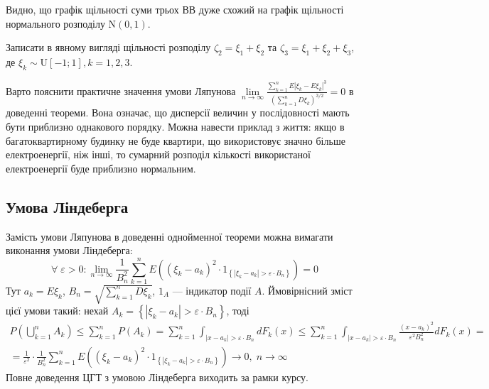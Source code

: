 Видно, що графік щільності суми трьох ВВ дуже схожий на графік щільності нормального розподілу $\mathrm{N}\left(0, 1\right)$.
\begin{exercise}
    Записати в явному вигляді щільності розподілу $\zeta_2 = \xi_1 + \xi_2$ та $\zeta_3 = \xi_1 + \xi_2 + \xi_3$, де
    $\xi_k \sim \mathrm{U}[-1; 1], k = 1,2,3$.
\end{exercise}
Варто пояснити практичне значення умови Ляпунова $\underset{n \rightarrow \infty}{\lim} \frac{\sum\limits_{k=1}^n E\left| \xi_k - E\xi_k\right|^3}{\left(
    \sum\limits_{k=1}^n D\xi_k
\right)^{3/2}} = 0$ в доведенні теореми. Вона означає, що дисперсії величин у послідовності мають бути приблизно однакового порядку. 
Можна навести приклад з життя: якщо в багатоквартирному будинку не буде квартири, що використовує значно більше електроенергії, ніж інші,
то сумарний розподіл кількості використаної електроенергії буде приблизно нормальним.

\subsection{Умова Ліндеберга}
    Замість умови Ляпунова в доведенні однойменної теореми можна вимагати виконання умови Ліндеберга:
    $$\forall \; \varepsilon > 0 : \underset{n\to\infty}{\lim} 
    \frac{1}{B_n^2}\sum\limits_{k=1}^n E \left( \left( \xi_k - a_k\right)^2 \cdot 1_{\left\{|\xi_k - a_k| > \varepsilon \cdot B_n\right\}}\right) = 0$$
    Тут $a_k = E\xi_k$, $B_n = \sqrt{\sum\limits_{k=1}^n D\xi_k}$, $1_A$ --- індикатор події $A$.
    Ймовірнісний зміст цієї умови такий: нехай $A_k = \left\{ \left|\xi_k - a_k \right| > \varepsilon \cdot B_n \right\}$, тоді
    \begin{gather*}
        P \left( \bigcup\limits_{k=1}^n A_k\right) \leq \sum\limits_{k=1}^n P(A_k) = \sum\limits_{k=1}^n \int_{|x-a_k| > \varepsilon \cdot B_n} dF_k(x) \leq
    \sum\limits_{k=1}^n \int_{|x-a_k| > \varepsilon \cdot B_n} \frac{(x-a_k)^2}{\varepsilon^2 B_n^2} dF_k(x) = \\
    = \frac{1}{\varepsilon^2} \cdot \frac{1}{B_n^2}\sum\limits_{k=1}^n E \left( \left( \xi_k - a_k\right)^2 \cdot 1_{\left\{|\xi_k - a_k| > \varepsilon \cdot B_n\right\}}\right) 
    \to 0, \; n\to\infty
    \end{gather*}
Повне доведення ЦГТ з умовою Ліндеберга виходить за рамки курсу.
